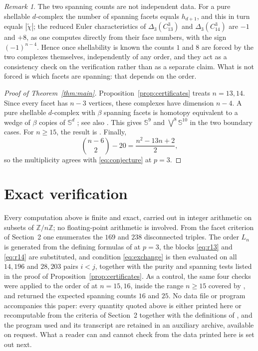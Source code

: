 \documentclass[11pt]{amsart}
\theoremstyle{remark}
\newtheorem{remark}[theorem]{Remark}
\newcommand{\Z}{\mathbb Z}
\newcommand{\Sph}{\mathbb S}
\begin{document}
\begin{remark}\label{rem:forced}
The two spanning counts are not independent data.  For a pure shellable
$d$-complex the number of spanning facets equals $h_{d+1}$, and this in turn
equals $|\widetilde\chi|$; the reduced Euler characteristics of
$\Delta_3(C_{13}^3)$ and $\Delta_3(C_{14}^3)$ are $-1$ and $+8$, as one
computes directly from their face numbers, with the sign $(-1)^{n-4}$.  Hence
once shellability is known the counts $1$ and $8$ are forced by the two
complexes themselves, independently of any order, and they act as a
consistency check on the verification rather than as a separate claim.  What
is not forced is which facets are spanning: that depends on the order.
\end{remark}

\begin{proof}[Proof of Theorem~\ref{thm:main}]
Proposition~\ref{prop:certificates} treats $n=13,14$.  Since every facet has
$n-3$ vertices, these complexes have dimension $n-4$.  A pure shellable
$d$-complex with $\beta$ spanning facets is homotopy equivalent to a wedge of
$\beta$ copies of $\Sph^d$ \cite[Theorem~12.3]{Kozlov}; see also
\cite[Theorem~2.3]{CS}.  This gives $\Sph^9$ and
$\bigvee^8\Sph^{10}$ in the two boundary cases.  For $n\ge15$, the result is
\cite[Theorem~1.4]{CS}.  Finally,
\[
  \binom{n-6}{2}-20=\frac{n^2-13n+2}{2},
\]
so the multiplicity agrees with \eqref{eq:conjecture} at $p=3$.
\end{proof}

\section*{Exact verification}

Every computation above is finite and exact, carried out in integer
arithmetic on subsets of $\Z/n\Z$; no floating-point arithmetic is involved.
From the facet criterion of Section~2 one enumerates the $169$ and $238$
disconnected triples.  The order $L_n$ is generated from the defining
formulas of \cite[Section~3]{CS} at $p=3$, the blocks \eqref{eq:r13} and
\eqref{eq:r14} are substituted, and condition \eqref{eq:exchange} is then
evaluated on all $14{,}196$ and $28{,}203$ pairs $i<j$, together with the
purity and spanning tests listed in the proof of
Proposition~\ref{prop:certificates}.  As a control, the same four checks were
applied to the order of \cite[Section~3]{CS} at $n=15,16$, inside the range
$n\ge15$ covered by \cite[Theorem~1.4]{CS}, and returned the expected spanning
counts $16$ and $25$.  No data file or program accompanies this paper: every
quantity quoted above is either printed here or recomputable from the criteria
of Section~2 together with the definitions of \cite[Section~3]{CS}, and the
program used and its transcript are retained in an auxiliary archive,
available on request.  What a reader can and cannot check from the data
printed here is set out next.
\end{document}
